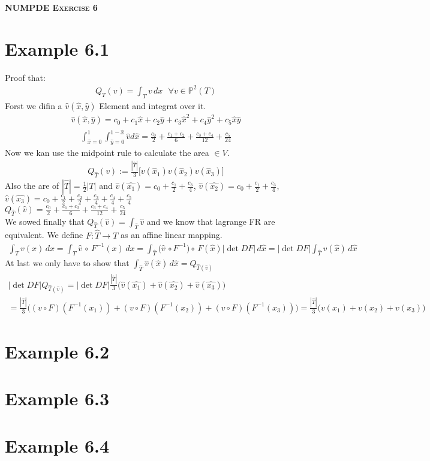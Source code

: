 \documentclass[11pt,a4paper]{article}
\begin{document}
\begin{center}
    \fontsize{24pt}{10pt}\selectfont
    \textsc{\textbf{NUMPDE Exercise 6}}
\end{center}
\section{Example 6.1}
Proof that:
\begin{align*}
Q_T(v) = \int_T v\,dx\,\,\,\, \forall v \in \mathbb{P}^2(T)
\end{align*}
Forst we difin a $\hat{v}(\hat{x},\hat{y})$ Element and integrat over it. 
\begin{align*}
\hat{v}(\hat{x},\hat{y}) = c_0+c_1\hat{x}+c_2\hat{y}+c_3\hat{x}^2+c_4\hat{y}^2+c_5\hat{x}\hat{y}
\end{align*}
\begin{align*}
\int_{\hat{x}=0}^1\int_{\hat{y}=0}^{1-\hat{x}}\hat{v}d\hat{x} = \frac{c_0}{2}+\frac{c_1+c_2}{6}+\frac{c_3+c_4}{12}+\frac{c_5}{24}
\end{align*}
Now we kan use the midpoint rule to calculate the area $\in V$.
\begin{align*}
Q_{\hat{T}}(v) := \frac{|\hat{T}|}{3}\big[v(\hat{x}_1)v(\hat{x}_2)v(\hat{x}_3)\big]
\end{align*}
Also the are of $|\hat{T}| = \frac{1}{2}|T|$ and $\hat{v}(\hat{x_1}) = c_0+\frac{c_1}{2}+\frac{c_3}{4}$,
$\hat{v}(\hat{x_2}) =c_0+\frac{c_1}{2}+\frac{c_3}{4}$,
$\hat{v}(\hat{x_3}) = c_0+\frac{c_1}{2}+\frac{c_2}{2}+\frac{c_3}{4}+\frac{c_4}{4}+\frac{c_5}{4}$\\
$Q_{\hat{T}}(\hat{v}) = \frac{c_0}{2}+\frac{c_1+c_2}{6}+\frac{c_3+c_4}{12}+\frac{c_5}{24}$\\
We sowed finally that $Q_{\hat{T}}(\hat{v}) = \int_{\hat{T}}\hat{v}$ and we know that lagrange FR are equivalent. We define $F: \hat{T} \to T$ as an affine linear mapping.
\begin{align*}
\int_{T}v(x)\, dx  = \int_T\hat{v}\, \circ\, F^{-1}(x)\,dx = \int_{\hat{T}}\Big(\hat{v}\,\circ F^{-1}\Big)\circ\,F(\hat{x})|\det DF|\,d\hat{x}=|\det DF|\int_{\hat{T}}\hat{v}(\hat{x})\,d\hat{x}
\end{align*}
At last we only have to show that $\int_{\hat{T}}\hat{v}(\hat{x})\,d\hat{x} = Q_{\hat{T}(\hat{v})}$
\begin{align*}
|\det DF|Q_{\hat{T}(\hat{v})} = |\det DF|\frac{|\hat{T}|}{3}\Big(\hat{v}(\hat{x_1})+\hat{v}(\hat{x_2})+\hat{v}(\hat{x_3})\Big)\\ =
\frac{|\hat{T}|}{3} \Bigg((v\circ F)(F^{-1}(x_1))+(v\circ F)(F^{-1}(x_2))+(v\circ F)(F^{-1}(x_3))\Bigg) = \frac{|\hat{T}|}{3}\Big(v(x_1)+v(x_2)+v(x_3)\Big)
\end{align*}
\section{Example 6.2}
\section{Example 6.3}
\section{Example 6.4}
\end{document}
